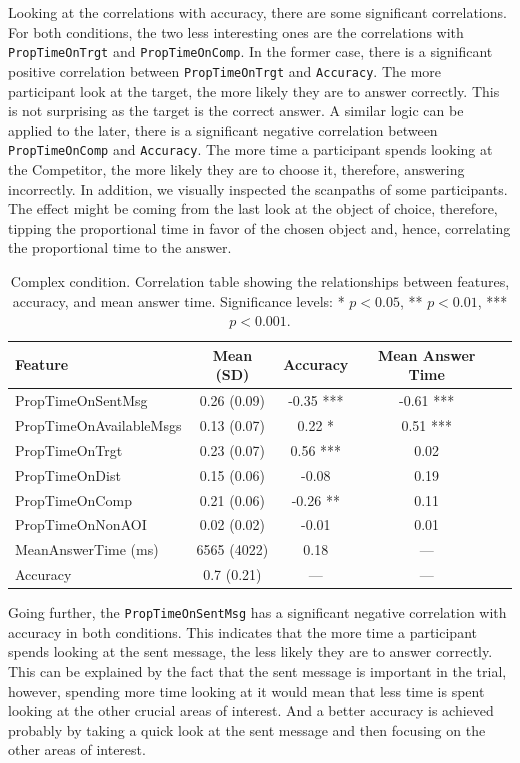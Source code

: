 Looking at the correlations with accuracy, there are some significant correlations. For both conditions, the two less interesting ones are the correlations with \texttt{PropTimeOnTrgt} and \texttt{PropTimeOnComp}. In the former case, there is a significant positive correlation between \texttt{PropTimeOnTrgt} and \texttt{Accuracy}. The more participant look at the target, the more likely they are to answer correctly. This is not surprising as the target is the correct answer. A similar logic can be applied to the later, there is a significant negative correlation between \texttt{PropTimeOnComp} and \texttt{Accuracy}. The more time a participant spends looking at the Competitor, the more likely they are to choose it, therefore, answering incorrectly. In addition, we visually inspected the scanpaths of some participants. The effect might be coming from the last look at the object of choice, therefore, tipping the proportional time in favor of the chosen object and, hence, correlating the proportional time to the answer.

\begin{table}[h!]
\centering
\begin{tabular}{|l|c|c|c|c|}
\hline
\textbf{Feature} & \textbf{Mean (SD)} & \textbf{Accuracy} & \textbf{Mean Answer Time} \\ \hline
PropTimeOnSentMsg & 0.26 (0.09) & -0.35 *** & -0.61 *** \\ \hline
PropTimeOnAvailableMsgs & 0.13 (0.07) & 0.22 * & 0.51 *** \\ \hline
PropTimeOnTrgt & 0.23 (0.07) & 0.56 *** & 0.02 \\ \hline
PropTimeOnDist & 0.15 (0.06) & -0.08 & 0.19 \\ \hline
PropTimeOnComp & 0.21 (0.06) & -0.26 ** & 0.11 \\ \hline
PropTimeOnNonAOI & 0.02 (0.02) & -0.01 & 0.01 \\ \hline
MeanAnswerTime (ms) & 6565 (4022) & 0.18 & --- \\ \hline
Accuracy & 0.7 (0.21) & --- & --- \\ \hline
\end{tabular}
\caption{Complex condition. Correlation table showing the relationships between features, accuracy, and mean answer time. Significance levels: * $p < 0.05$, ** $p < 0.01$, *** $p < 0.001$.}
\label{tab:correlation_table_complex}
\end{table}

Going further, the \texttt{PropTimeOnSentMsg} has a significant negative correlation with accuracy in both conditions. This indicates that the more time a participant spends looking at the sent message, the less likely they are to answer correctly. This can be explained by the fact that the sent message is important in the trial, however, spending more time looking at it would mean that less time is spent looking at the other crucial areas of interest. And a better accuracy is achieved probably by taking a quick look at the sent message and then focusing on the other areas of interest. 

